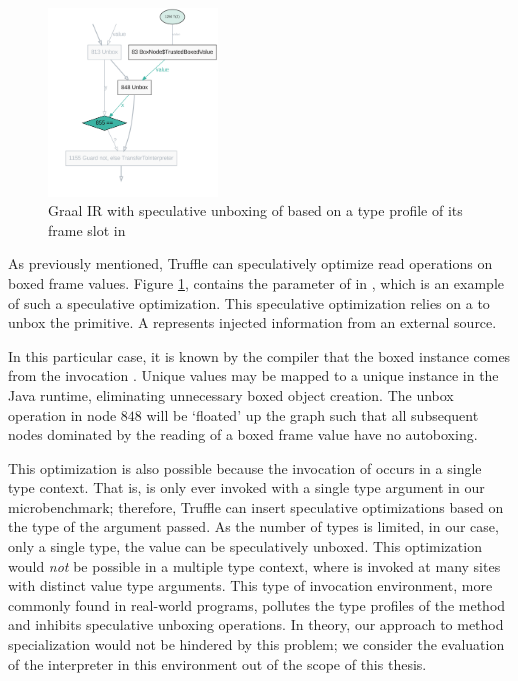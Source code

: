 \begin{figure}[!htb]
	\centering
	\includegraphics[width=0.4\textwidth]{figures/dot/List.contains.boxed-param-read.TruffleTier.png}
	\caption{Graal IR with speculative unboxing of  based on a type profile of its frame slot in }
	\label{graalir:cons-contains-param-read}
\end{figure}

As previously mentioned, Truffle can speculatively optimize read operations on boxed frame values.
Figure \ref{graalir:cons-contains-param-read}, contains the parameter of  in , which is an example of such a speculative optimization.
This speculative optimization relies on a  to unbox the primitive.
A  represents injected information from an external source.

In this particular case, it is known by the compiler that the boxed instance comes from the invocation .
Unique  values may be mapped to a unique  instance in the Java runtime, eliminating unnecessary boxed object creation.
The unbox operation in node $848$ will be `floated' up the graph such that all subsequent nodes dominated by the reading of a boxed frame value have no autoboxing.

This optimization is also possible because the invocation of  occurs in a single type context.
That is,  is only ever invoked with a single type argument in our microbenchmark; therefore, Truffle can insert speculative optimizations based on the type of the argument passed.
As the number of types is limited, in our case, only a single type, the value can be speculatively unboxed.
This optimization would \textit{not} be possible in a multiple type context, where  is invoked at many sites with distinct value type arguments.
This type of invocation environment, more commonly found in real-world programs, pollutes the type profiles of the method and inhibits speculative unboxing operations.
In theory, our approach to method specialization would not be hindered by this problem; we consider the evaluation of the interpreter in this environment out of the scope of this thesis.

